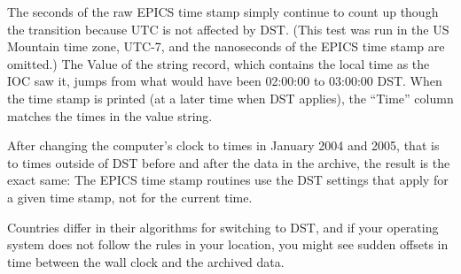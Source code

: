 \medskip
\noindent The seconds of the raw EPICS time stamp simply continue to count up
though the transition because UTC is not affected by DST.
(This test was run in the US Mountain time zone, UTC-7, and the
nanoseconds of the EPICS time stamp are omitted.)
The Value of the string record, which contains the local time as the
IOC saw it, jumps from what would have been 02:00:00 to 03:00:00 DST.
When the time stamp is printed (at a later time when DST applies),
the ``Time'' column matches the times in the value string.

After changing the computer's clock to times in January 2004 and 2005,
that is to times outside of DST before and after the data in the
archive, the result is the exact same:
The EPICS time stamp routines use the DST settings that apply for a
given time stamp, not for the current time.

Countries differ in their algorithms for switching to DST, and if your
operating system does not follow the rules in your location, you might
see sudden offsets in time between the wall clock and the archived
data.
